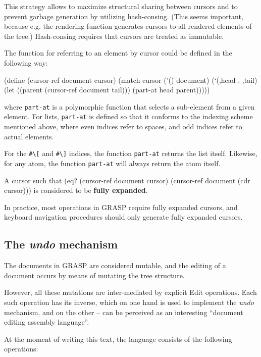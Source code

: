 \documentclass[sigconf]{acmart}
\newenvironment{Snippet}{\Verbatim[samepage=true]}{\endVerbatim}
\begin{document}
This strategy allows to maximize structural sharing
between cursors and to prevent garbage generation
by utilizing hash-consing. (This seems important, because
e.g. the rendering function generates cursors to all
rendered elements of the tree.)
Hash-consing requires that cursors are treated as
immutable.

The function for referring to an element by cursor
could be defined in the following way:

\begin{Snippet}
(define (cursor-ref document cursor)
  (match cursor
    ('()
     document)
    (`(,head . ,tail)
     (let ((parent (cursor-ref document tail)))
       (part-at head parent)))))
\end{Snippet}

where \texttt{part-at} is a polymorphic function that selects
a sub-element from a given element. For lists,
\texttt{part-at} is defined so that it conforms to the indexing
scheme mentioned above, where even indices refer
to spaces, and odd indices refer to actual elements.

For the \texttt{\#\textbackslash[} and \texttt{\#\textbackslash]} indices, the 
function \texttt{part-at} returns the list itself. 
Likewise, for any atom, the function \texttt{part-at} will
always return the atom itself.

A cursor such that 
\begin{Snippet}
(eq? (cursor-ref document cursor)
     (cursor-ref document (cdr cursor)))
\end{Snippet}
is considered to be \textbf{fully expanded}.

In practice, most operations in GRASP require
fully expanded cursors, and keyboard navigation
procedures should only generate fully expanded
cursors.

\subsection{The \textit{undo} mechanism}

The documents in GRASP are considered mutable,
and the editing of a document occurs by means
of mutating the tree structure.

However, all these mutations are inter-mediated
by explicit Edit operations. Each such operation
has its inverse, which on one hand is used to
implement the \textit{undo} mechanism, and on 
the other -- can be perceived as an interesting 
``document editing assembly language''.

At the moment of writing this text, the language
consists of the following operations:
\end{document}
